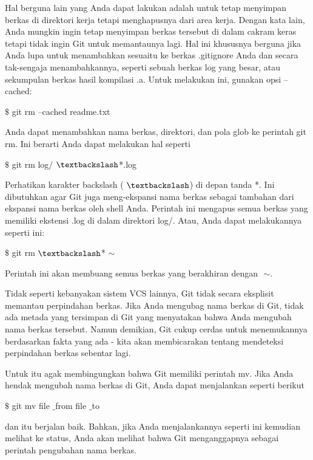 \noindent 
Hal berguna lain yang Anda dapat lakukan adalah untuk tetap menyimpan berkas di direktori kerja tetapi menghapusnya dari area kerja. Dengan kata lain, Anda mungkin ingin tetap menyimpan berkas tersebut di dalam cakram keras tetapi tidak ingin Git untuk memantaunya lagi. Hal ini khususnya berguna jika Anda lupa untuk menambahkan sesuaitu ke berkas $  $.gitignore $  $Anda dan secara tak-sengaja menambahkannya, seperti sebuah berkas log yang besar, atau sekumpulan berkas hasil kompilasi $  $.a. Untuk melakukan ini, gunakan opsi $  $--cached: \par
\noindent 
 $  \$  $ git rm --cached readme.txt \par
\noindent 
Anda dapat menambahkan nama berkas, direktori, dan pola glob ke perintah $  $git rm. Ini berarti Anda dapat melakukan hal seperti \par
\noindent 
 $  \$  $ git rm log/ $  \textbackslash  $*.log \par
\noindent 
Perhatikan karakter backslash ( $  \textbackslash  $) di depan tanda $  $*. Ini dibutuhkan agar Git juga meng-ekspansi nama berkas sebagai tambahan dari ekspansi nama berkas oleh shell Anda. Perintah ini mengapus semua berkas yang memiliki ekstensi $  $.log $  $di dalam direktori $  $log/. Atau, Anda dapat melakukannya seperti ini: \par
\noindent 
 $  \$  $ git rm  $  \textbackslash  $* $  \sim  $ \par
\noindent 
Perintah ini akan membuang semua berkas yang berakhiran dengan $  $ $  \sim  $. \par
 \par
\noindent 
Tidak seperti kebanyakan sistem VCS lainnya, Git tidak secara eksplisit memantau perpindahan berkas. Jika Anda mengubag nama berkas di Git, tidak ada metada yang tersimpan di Git yang menyatakan bahwa Anda mengubah nama berkas tersebut. Namun demikian, Git cukup cerdas untuk menemukannya berdasarkan fakta yang ada - kita akan membicarakan tentang mendeteksi perpindahan berkas sebentar lagi. \par
\noindent 
Untuk itu agak membingungkan bahwa Git memiliki perintah $  $mv. Jika Anda hendak mengubah nama berkas di Git, Anda dapat menjalankan seperti berikut \par
\noindent 
 $  \$  $ git mv file $  \_  $from file $  \_  $to \par
\noindent 
dan itu berjalan baik. Bahkan, jika Anda menjalankannya seperti ini kemudian melihat ke status, Anda akan melihat bahwa Git menganggapnya sebagai perintah pengubahan nama berkas. \par
